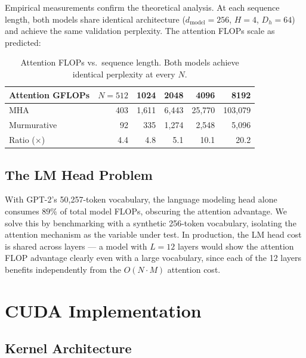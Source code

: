 \documentclass{article}
\begin{document}
Empirical measurements confirm the theoretical analysis. At each sequence length, both models share identical architecture ($d_{\mathrm{model}} = 256$, $H = 4$, $D_h = 64$) and achieve the same validation perplexity. The attention FLOPs scale as predicted:

\begin{table}[H]
\centering
\caption{Attention FLOPs vs.\ sequence length. Both models achieve identical perplexity at every $N$.}
\label{tab:flop-scaling}
\begin{tabular}{@{}lrrrrr@{}}
\toprule
\textbf{Attention GFLOPs} & \textbf{$N=512$} & \textbf{1024} & \textbf{2048} & \textbf{4096} & \textbf{8192} \\
\midrule
MHA        & 403 & 1{,}611 & 6{,}443 & 25{,}770 & 103{,}079 \\
Murmurative & 92  & 335    & 1{,}274 & 2{,}548  & 5{,}096   \\
\midrule
Ratio ($\times$) & 4.4 & 4.8 & 5.1 & 10.1 & 20.2 \\
\bottomrule
\end{tabular}
\end{table}

\subsection{The LM Head Problem}

With GPT-2's 50{,}257-token vocabulary, the language modeling head alone consumes $89\%$ of total model FLOPs, obscuring the attention advantage. We solve this by benchmarking with a synthetic 256-token vocabulary, isolating the attention mechanism as the variable under test. In production, the LM head cost is shared across layers — a model with $L=12$ layers would show the attention FLOP advantage clearly even with a large vocabulary, since each of the 12 layers benefits independently from the $O(N \cdot M)$ attention cost.

\section{CUDA Implementation}

\subsection{Kernel Architecture}
\end{document}
